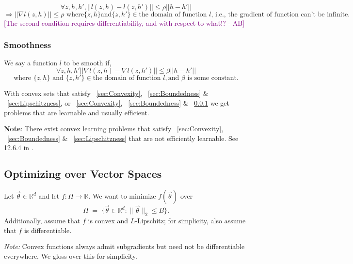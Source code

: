 \documentclass[11pt]{article}
\newcommand{\ab}[1]{\textcolor{purple}{[#1 - AB]}}
\theoremstyle{plain}
\begin{document}
\[
\forall z,h,h', \lvert\lvert l(z,h) - l(z,h') \rvert\rvert \leq \rho \lvert\lvert h-h'\rvert\rvert
\]
\[
\Rightarrow \lvert\lvert\nabla l(z,h)\rvert\rvert \leq \rho \text{ where} \{z,h\} \text{and} \{z, h'\} \in \text{the domain of function $l$, i.e., the gradient of function can't be infinite.} 
\]
\ab{The second condition requires differentiability, and with respect to what!?}

\subsubsection{Smoothness}\label{sec:Smoothness}
We say a function $l$ to be smooth if,
\[
\forall z,h,h' \lvert\lvert \nabla l(z,h) - \nabla l(z,h')\rvert\rvert \leq \beta\lvert\lvert h-h'\rvert\rvert 
\]
\[
\text{where } \{z,h\} \text{ and } \{z, h'\} \in \text{the domain of function }l, \text{and } \beta \text{ is some constant}.
\]

With convex sets that satisfy ~\ref{sec:Convexity}, ~\ref{sec:Boundedness} \& ~\ref{sec:Lipschitzness}, or  ~\ref{sec:Convexity}, ~\ref{sec:Boundedness} \& ~\ref{sec:Smoothness} we get problems that are learnable and usually efficient.

\noindent \textbf{Note}: There exist convex learning problems that satisfy
~\ref{sec:Convexity}, ~\ref{sec:Boundedness} \& ~\ref{sec:Lipschitzness} that
are not efficiently learnable. See 12.6.4 in \cite{ShalevShwartzUnderstandingML}.

\subsection{Optimizing over Vector Spaces}
Let $\vec{\theta}\in\mathbb{R}^d$ and let $f:H\to\mathbb{R}$. We want to minimize $f(\vec{\theta})$ over
\[
  H \;=\; \bigl\{\vec{\theta}\in\mathbb{R}^d : \lVert \vec{\theta}\rVert_2 \le B \bigr\}.
\]
Additionally, assume that $f$ is convex and $L$-Lipschitz; for simplicity, also assume that $f$ is differentiable.

\smallskip
\noindent\textit{Note:} Convex functions always admit subgradients but need not be differentiable everywhere. We gloss over this for simplicity.
\end{document}

